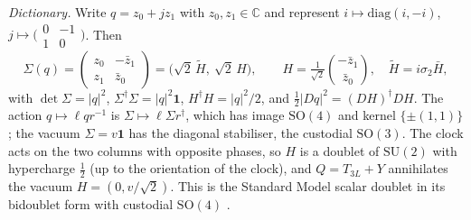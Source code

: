 \documentclass[aps,pra,onecolumn,superscriptaddress,nofootinbib,10pt]{revtex4-2}
\theoremstyle{definition}
\theoremstyle{remark}
\newcommand{\C}{\mathbb{C}}
\newcommand{\SU}{\mathrm{SU}}
\newcommand{\SO}{\mathrm{SO}}
\begin{document}
\smallskip\noindent\emph{Dictionary.}  Write $q=z_0+jz_1$ with $z_0,z_1\in\C$ and represent $i\mapsto\mathrm{diag}(i,-i)$,
$j\mapsto\bigl(\begin{smallmatrix}0&-1\\1&0\end{smallmatrix}\bigr)$.  Then
\[
\Sigma(q)=\begin{pmatrix}z_0&-\bar z_1\\ z_1&\bar z_0\end{pmatrix}=\bigl(\sqrt2\,\widetilde H,\ \sqrt2\,H\bigr),\qquad
H=\tfrac1{\sqrt2}\binom{-\bar z_1}{\bar z_0},\quad \widetilde H=i\sigma_2\bar H,
\]
with $\det\Sigma=\lvert q\rvert^2$, $\Sigma^\dagger\Sigma=\lvert q\rvert^2\mathbf1$, $H^\dagger H=\lvert q\rvert^2/2$, and $\tfrac12\lvert Dq\rvert^2=(DH)^\dagger DH$.  The action
$q\mapsto\ell qr^{-1}$ is $\Sigma\mapsto\ell\Sigma r^\dagger$, which has image $\SO(4)$ and kernel $\{\pm(1,1)\}$; the vacuum $\Sigma=v\mathbf1$ has
the diagonal stabiliser, the custodial $\SO(3)$.  The clock acts on the two columns with opposite phases,
so $H$ is a doublet of $\SU(2)$ with hypercharge $\tfrac12$ (up to the orientation of the clock), and
$Q=T_{3L}+Y$ annihilates the vacuum $H=(0,v/\sqrt2)$.  This is the Standard Model scalar doublet in its
bidoublet form with custodial $\SO(4)$ \cite{SSVZ}.
\end{document}
